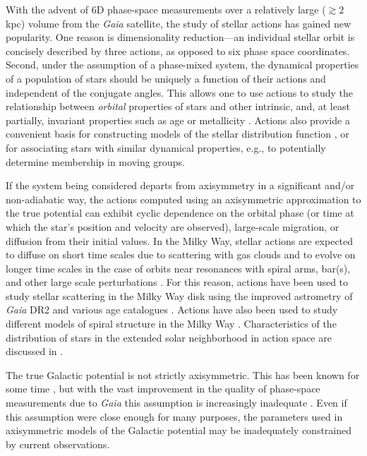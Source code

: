 \documentclass[twocolumn]{aastex62}
\begin{document}
With the advent of 6D phase-space measurements over a relatively large ($\gtrsim
2$ kpc) volume from the \textit{Gaia} satellite, the study of stellar actions
has gained new popularity. One reason is dimensionality reduction---an
individual stellar orbit is concisely described by three actions, as opposed to
six phase space coordinates. Second, under the assumption of a phase-mixed
system, the dynamical properties of a population of stars should be uniquely a
function of their actions and independent of the conjugate angles. This allows
one to use actions to study the relationship between \emph{orbital} properties
of stars and other intrinsic, and, at least partially, invariant properties such
as age or metallicity \citep{2018ApJ...867...31B, 2018arXiv180803278T,
2018MNRAS.481.4093S, 2019arXiv190304030G, 2019arXiv190309320D,
2019MNRAS.486.1167B}. Actions also provide a convenient basis for constructing
models of the stellar distribution function \citep[e.g.,][]{1915MNRAS..76...70J,
1985ApJ...295..388V, 2017ApJ...839...61T}, or for associating stars with similar
dynamical properties, e.g., to potentially determine membership in moving
groups.

If the system being considered departs from axisymmetry in a significant and/or
non-adiabatic way, the actions computed using an axisymmetric approximation to
the true potential can exhibit cyclic dependence on the orbital phase (or time
at which the star's position and velocity are observed), large-scale migration,
or diffusion from their initial values. In the Milky Way, stellar actions are
expected to diffuse on short time scales due to scattering with gas clouds and
to evolve on longer time scales in the case of orbits near resonances with
spiral arms, bar(s), and other large scale perturbations
\citep{2014RvMP...86....1S}. For this reason, actions have been used to study
stellar scattering in the Milky Way disk using the improved astrometry of
\textit{Gaia} DR2 and various age catalogues \citep{2018ApJ...867...31B,
2018arXiv180803278T}. Actions have also been used to study different models of
spiral structure in the Milky Way \citep{2019MNRAS.tmp..155S}. Characteristics
of the distribution of stars in the extended solar neighborhood in action space
are discussed in \citet{2019MNRAS.484.3291T}.

The true Galactic potential is not strictly axisymmetric. This has been known
for some time \citep[e.g.,][]{1957AJ.....62...93K,2009MNRAS.396L..56M,
2012ApJ...750L..41W}, but with the vast improvement in the quality of
phase-space measurements due to \textit{Gaia} this assumption is increasingly
inadequate \citep[e.g.,][]{2018Natur.561..360A, 2019MNRAS.485.3134L}. Even if
this assumption were close enough for many purposes, the parameters used in
axisymmetric models of the Galactic potential may be inadequately constrained by
current observations.
\end{document}

